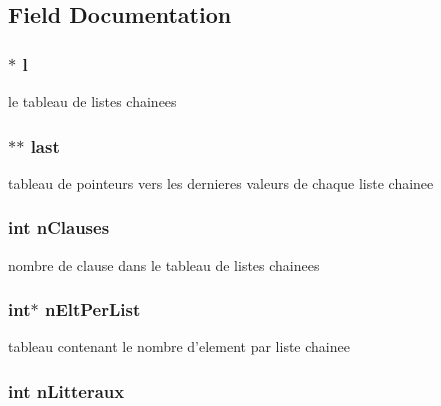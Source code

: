 \subsection{Field Documentation}
\hypertarget{structliste_a6b2c4c7aa0493f3349f113ca8c1568de}{
\subsubsection[{l}]{$\ast$ l}}\label{structliste_a6b2c4c7aa0493f3349f113ca8c1568de}


le tableau de listes chainees 

\hypertarget{structliste_ae483f1d1b19346e2a37a180bcb512c08}{
\subsubsection[{last}]{$\ast$$\ast$ last}}\label{structliste_ae483f1d1b19346e2a37a180bcb512c08}


tableau de pointeurs vers les dernieres valeurs de chaque liste chainee 

\hypertarget{structliste_a558c751995cc8454977646fe8d24a76a}{
\subsubsection[{n\-Clauses}]{\setlength{\rightskip}{0pt plus 5cm}int n\-Clauses}}\label{structliste_a558c751995cc8454977646fe8d24a76a}


nombre de clause dans le tableau de listes chainees 

\hypertarget{structliste_ada6bed3b1b837bfaabd9f323ee011cda}{
\subsubsection[{n\-Elt\-Per\-List}]{\setlength{\rightskip}{0pt plus 5cm}int$\ast$ n\-Elt\-Per\-List}}\label{structliste_ada6bed3b1b837bfaabd9f323ee011cda}


tableau contenant le nombre d'element par liste chainee 

\hypertarget{structliste_aed14ae4c104373df7b9ec2d06aa88f8f}{
\subsubsection[{n\-Litteraux}]{\setlength{\rightskip}{0pt plus 5cm}int n\-Litteraux}}\label{structliste_aed14ae4c104373df7b9ec2d06aa88f8f}


